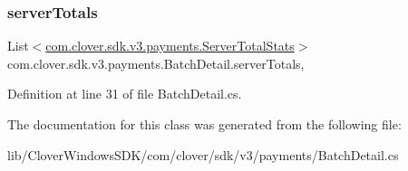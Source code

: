 \subsubsection{\texorpdfstring{server\+Totals}{serverTotals}}
{\footnotesize\ttfamily List$<$\hyperlink{classcom_1_1clover_1_1sdk_1_1v3_1_1payments_1_1_server_total_stats}{com.\+clover.\+sdk.\+v3.\+payments.\+Server\+Total\+Stats}$>$ com.\+clover.\+sdk.\+v3.\+payments.\+Batch\+Detail.\+server\+Totals\hspace{0.3cm}{\ttfamily [get]}, {\ttfamily [set]}}



Definition at line 31 of file Batch\+Detail.\+cs.



The documentation for this class was generated from the following file\+:\begin{DoxyCompactItemize}
\item 
lib/\+Clover\+Windows\+S\+D\+K/com/clover/sdk/v3/payments/Batch\+Detail.\+cs\end{DoxyCompactItemize}
